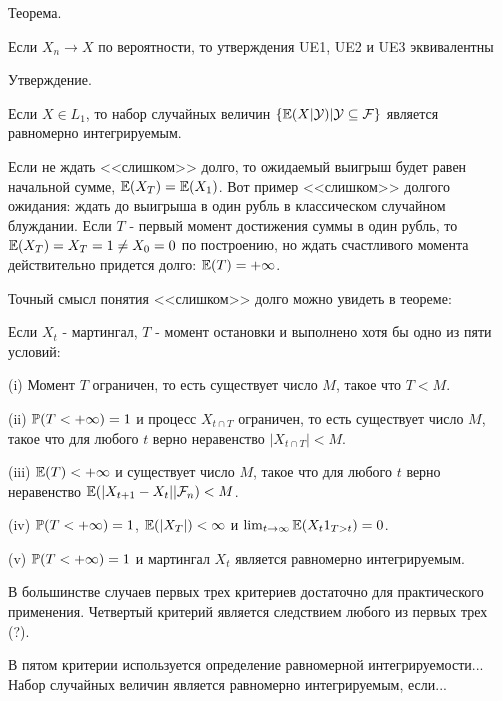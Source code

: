 {Теорема. \par
Если $X_{n} \rightarrow X$ по вероятности, то утверждения UE1, UE2
и UE3 эквивалентны \par

Утверждение. \par
Если $X \in L_{1}$, то набор случайных величин
$\{\E(X|\mathcal{Y})|\mathcal{Y}\subseteq \mathcal{F}\}$ является
равномерно интегрируемым. \par





Если не ждать <<слишком>> долго, то ожидаемый выигрыш будет равен начальной сумме, $\E(X_{T})=\E(X_{1})$. Вот пример <<слишком>> долгого ожидания: ждать до выигрыша в один рубль в классическом случайном блуждании. Если $T$ - первый момент достижения суммы в один рубль, то $\E(X_{T})=X_{T}=1\neq X_{0}=0$ по построению, но ждать счастливого момента действительно придется долго: $\E(T)=+\infty$.

Точный смысл понятия <<слишком>> долго можно увидеть в теореме:

Если $X_{t}$ - мартингал, $T$ - момент остановки и выполнено хотя бы одно из пяти условий:

(i) Момент $T$ ограничен, то есть существует число $M$, такое что $T<M$.

(ii) $\P(T<+\infty)=1$ и процесс $X_{t\cap T}$ ограничен, то есть существует число $M$, такое что для любого $t$ верно неравенство $|X_{t\cap T}|<M$.

(iii) $\E(T)<+\infty$ и существует число $M$, такое что для любого $t$ верно неравенство $\E(|X_{t+1}-X_{t}||\mathcal{F}_{n})<M$.

(iv) $\P(T<+\infty)=1$, $\E(|X_{T}|)<\infty$ и $\lim_{t\to\infty}\E(X_{t}1_{T>t})=0$.

(v) $\P(T<+\infty)=1$ и мартингал $X_{t}$ является равномерно интегрируемым.

В большинстве случаев первых трех критериев достаточно для практического применения.
Четвертый критерий является следствием любого из первых трех (?).

В пятом критерии используется определение равномерной интегрируемости...
Набор случайных величин является равномерно интегрируемым, если...


}
